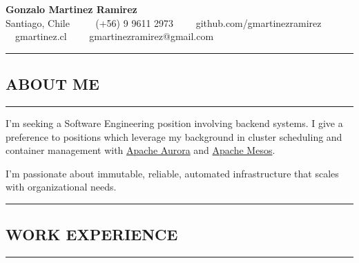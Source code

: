 \documentclass[10pt,letterpaper]{article}
\newcommand{\titlePersonalInfo}[6]{
  \begin{center}{\huge \textbf{#1}}
  \\  #2 \ \ \textbullet
    \ \ #3\ \ \textbullet
    \ \ #4\ \ \textbullet
    \ \ #5\ \ \textbullet
    \ \ #6    
  \end{center}
}
\newcommand{\sectionTitle}[1]{
  \hrule
  \vspace{-1.0em} 
  \subsection*{\uppercase{\textbf{#1}}}
  \vspace{-0.3em}
    \hrule
    \vspace{0.5em}  
}
\begin{document}
    
  \titlePersonalInfo{Gonzalo Martinez Ramirez}{Santiago, Chile}{(+56) 9 9611 2973}{github.com/gmartinezramirez}{gmartinez.cl}{gmartinezramirez@gmail.com}
  
  \sectionTitle{About me}
  
  \noindent I'm seeking a Software Engineering position involving backend systems.
  I give a preference to positions which leverage my background in cluster
  scheduling and container management with \href{aurora.apache.org}{Apache Aurora}
  and \href{mesos.apache.org}{Apache Mesos}.
  
  \noindent I'm passionate about immutable, reliable, automated infrastructure
  that scales with organizational needs.
  \\
  
  \sectionTitle{Work Experience}
  
\end{document}
